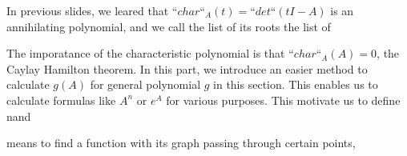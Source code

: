 

In previous slides, we leared that $“char“_A(t)=“det“(tI-A)$ is an annihilating polynomial, and we call the list of its roots the list of 
\vfill

The imporatance of the characteristic polynomial is that $“char“_A(A)=0$, the Caylay Hamilton theorem. 
\vfill
In this part, we introduce an easier method to calculate $g(A)$ for general polynomial $g$ in this section. This enables us to calculate formulas like $A^n$ or $e^A$ for various purposes. This motivate us to define  nand 

 means to find a function with its graph passing through certain points,

